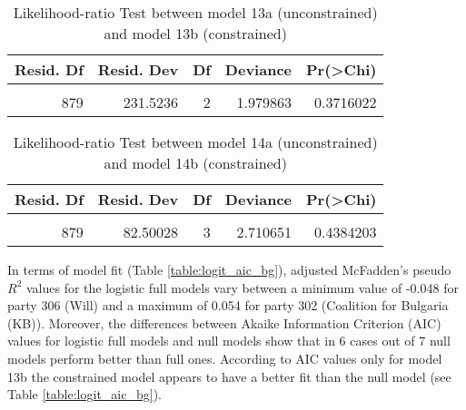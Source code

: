 \documentclass[
]{article}
\begin{document}
\begin{table}[!h]

\caption{\label{tab:unnamed-chunk-19}Likelihood-ratio Test between model 13a (unconstrained) and model 13b (constrained)
                  \label{table:lrtest_3_bg}}
\centering
\begin{tabular}[t]{r|r|r|r|r}
\hline
Resid. Df & Resid. Dev & Df & Deviance & Pr(>Chi)\\
\hline
\cellcolor{gray!6}{881} & \cellcolor{gray!6}{233.5034} & \cellcolor{gray!6}{} & \cellcolor{gray!6}{} & \cellcolor{gray!6}{}\\
\hline
879 & 231.5236 & 2 & 1.979863 & 0.3716022\\
\hline
\end{tabular}
\end{table}

\begin{table}[!h]

\caption{\label{tab:unnamed-chunk-19}Likelihood-ratio Test between model 14a (unconstrained) and model 14b (constrained)
                  \label{table:lrtest_4_bg}}
\centering
\begin{tabular}[t]{r|r|r|r|r}
\hline
Resid. Df & Resid. Dev & Df & Deviance & Pr(>Chi)\\
\hline
\cellcolor{gray!6}{882} & \cellcolor{gray!6}{85.21094} & \cellcolor{gray!6}{} & \cellcolor{gray!6}{} & \cellcolor{gray!6}{}\\
\hline
879 & 82.50028 & 3 & 2.710651 & 0.4384203\\
\hline
\end{tabular}
\end{table}

In terms of model fit (Table \ref{table:logit_aic_bg}), adjusted McFadden's pseudo \(R^2\) values for the
logistic full models vary between a minimum value of
-0.048
for party 306
(Will)
and a maximum of
0.054
for party 302
(Coalition for Bulgaria (KB)). Moreover, the differences between Akaike Information Criterion (AIC) values for logistic full models and
null models show that in 6 cases out of 7 null models perform better than full ones. According to AIC
values only for model 13b the constrained model appears to have a better fit than the null model (see Table \ref{table:logit_aic_bg}).
\end{document}
